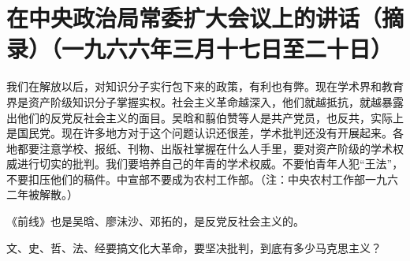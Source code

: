 \section[在中央政治局常委扩大会议上的讲话（摘录）（一九六六年三月十七日至二十日）]{在中央政治局常委扩大会议上的讲话（摘录）（一九六六年三月十七日至二十日）}


我们在解放以后，对知识分子实行包下来的政策，有利也有弊。现在学术界和教育界是资产阶级知识分子掌握实权。社会主义革命越深入，他们就越抵抗，就越暴露出他们的反党反社会主义的面目。吴晗和翦伯赞等人是共产党员，也反共，实际上是国民党。现在许多地方对于这个问题认识还很差，学术批判还没有开展起来。各地都要注意学校、报纸、刊物、出版社掌握在什么人手里，要对资产阶级的学术权威进行切实的批判。我们要培养自己的年青的学术权威。不要怕青年人犯“王法”，不要扣压他们的稿件。中宣部不要成为农村工作部。（注：中央农村工作部一九六二年被解散。）

《前线》也是吴晗、廖沬沙、邓拓的，是反党反社会主义的。

文、史、哲、法、经要搞文化大革命，要坚决批判，到底有多少马克思主义？

